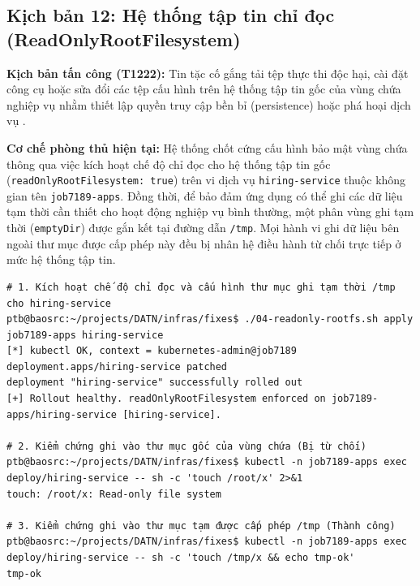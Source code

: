 \subsection{Kịch bản 12: Hệ thống tập tin chỉ đọc (ReadOnlyRootFilesystem)}
\label{subsec:c3_kb12}

\textbf{Kịch bản tấn công (T1222):} Tin tặc cố gắng tải tệp thực thi độc hại, cài đặt công cụ hoặc sửa đổi các tệp cấu hình trên hệ thống tập tin gốc của vùng chứa nghiệp vụ nhằm thiết lập quyền truy cập bền bỉ (persistence) hoặc phá hoại dịch vụ \parencite{mitre_t1222}.

\textbf{Cơ chế phòng thủ hiện tại:} Hệ thống chốt cứng cấu hình bảo mật vùng chứa thông qua việc kích hoạt chế độ chỉ đọc cho hệ thống tập tin gốc (\texttt{readOnlyRootFilesystem: true}) trên vi dịch vụ \texttt{hiring-service} thuộc không gian tên \texttt{job7189-apps}. Đồng thời, để bảo đảm ứng dụng có thể ghi các dữ liệu tạm thời cần thiết cho hoạt động nghiệp vụ bình thường, một phân vùng ghi tạm thời (\texttt{emptyDir}) được gắn kết tại đường dẫn \texttt{/tmp}. Mọi hành vi ghi dữ liệu bên ngoài thư mục được cấp phép này đều bị nhân hệ điều hành từ chối trực tiếp ở mức hệ thống tập tin.

\begin{listing}[H]
\begin{verbatim}
# 1. Kích hoạt chế độ chỉ đọc và cấu hình thư mục ghi tạm thời /tmp cho hiring-service
ptb@baosrc:~/projects/DATN/infras/fixes$ ./04-readonly-rootfs.sh apply job7189-apps hiring-service
[*] kubectl OK, context = kubernetes-admin@job7189
deployment.apps/hiring-service patched
deployment "hiring-service" successfully rolled out
[+] Rollout healthy. readOnlyRootFilesystem enforced on job7189-apps/hiring-service [hiring-service].

# 2. Kiểm chứng ghi vào thư mục gốc của vùng chứa (Bị từ chối)
ptb@baosrc:~/projects/DATN/infras/fixes$ kubectl -n job7189-apps exec deploy/hiring-service -- sh -c 'touch /root/x' 2>&1
touch: /root/x: Read-only file system

# 3. Kiểm chứng ghi vào thư mục tạm được cấp phép /tmp (Thành công)
ptb@baosrc:~/projects/DATN/infras/fixes$ kubectl -n job7189-apps exec deploy/hiring-service -- sh -c 'touch /tmp/x && echo tmp-ok'
tmp-ok
\end{verbatim}
\caption{Quá trình cấu hình cưỡng chế ReadOnlyRootFilesystem và kết quả kiểm thử thực tế}
\label{lst:c3_kb12}
\end{listing}


